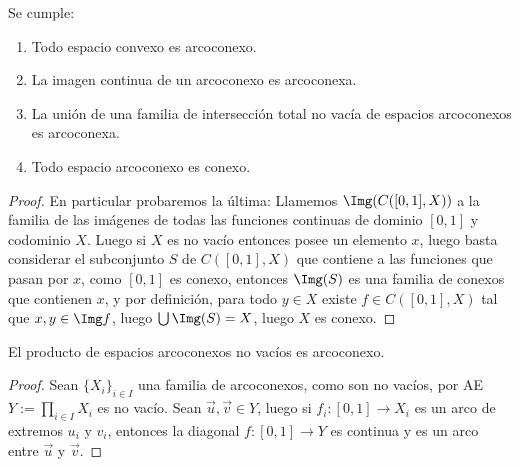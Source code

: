 \documentclass[topologia-analisis.tex]{subfiles}
\begin{document}
\begin{prop}
	Se cumple:
	\begin{enumerate}
		\item Todo espacio convexo es arcoconexo.
		\item La imagen continua de un arcoconexo es arcoconexa.
		\item La unión de una familia de intersección total no vacía de espacios arcoconexos es arcoconexa.
		\item Todo espacio arcoconexo es conexo.
	\end{enumerate}
\end{prop}
\begin{proof}
	En particular probaremos la última:
	Llamemos $\Img( C([0,1], X) )$ a la familia de las imágenes de todas las funciones continuas de dominio $[0,1]$ y codominio $X$.
	Luego si $X$ es no vacío entonces posee un elemento $x$, luego basta considerar el subconjunto $S$ de $C([0,1], X)$
	que contiene a las funciones que pasan por $x$, como $[0,1]$ es conexo, entonces $\Img(S)$ es una familia de conexos que contienen $x$,
	y por definición, para todo $y\in X$ existe $f\in C([0,1], X)$ tal que $x,y\in\Img f$, luego $\bigcup \Img(S) = X$, luego $X$ es conexo.
\end{proof}

\begin{thm}
	El producto de espacios arcoconexos no vacíos es arcoconexo.
\end{thm}
\begin{proof}
	Sean $\{X_i\}_{i\in I}$ una familia de arcoconexos, como son no vacíos, por AE $Y := \prod_{i\in I} X_i$ es no vacío.
	Sean $\vec u,\vec v\in Y$, luego si $f_i:[0,1] \to X_i$ es un arco de extremos $u_i$ y $v_i$,
	entonces la diagonal $f\colon [0,1] \to Y$ es continua y es un arco entre $\vec u$ y $\vec v$.
\end{proof}
\thmdep{}

\end{document}
